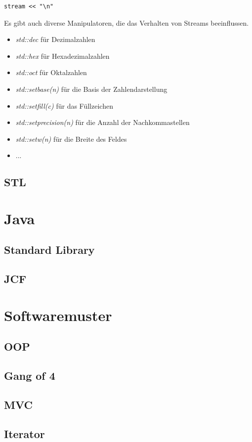 \documentclass[12pt]{scrartcl}
\begin{document}
\begin{verbatim}
stream << "\n"
\end{verbatim}

Es gibt auch diverse Manipulatoren, die das Verhalten von Streams beeinflussen.
\begin{itemize}
	\item \emph{std::dec} für Dezimalzahlen
	\item \emph{std::hex} für Hexadezimalzahlen
	\item \emph{std::oct} für Oktalzahlen
	\item \emph{std::setbase(n)} für die Basis der Zahlendarstellung
	\item \emph{std::setfill(c)} für das Füllzeichen
	\item \emph{std::setprecision(n)} für die Anzahl der Nachkommastellen
	\item \emph{std::setw(n)} für die Breite des Feldes
	\item ...
\end{itemize}

\subsection{STL}
\section{Java}
\subsection{Standard Library}
\subsection{JCF}
\section{Softwaremuster}
\subsection{OOP}
\subsection{Gang of 4}
\subsection{MVC}
\subsection{Iterator}
\end{document}
